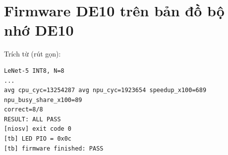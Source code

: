 \section{Firmware DE10 trên bản đồ bộ nhớ DE10}
Trích từ  (rút gọn):
\begin{lstlisting}[style=codelog]
LeNet-5 INT8, N=8
...
avg cpu_cyc=13254287 avg npu_cyc=1923654 speedup_x100=689 npu_busy_share_x100=89
correct=8/8
RESULT: ALL PASS
[niosv] exit code 0
[tb] LED PIO = 0x0c
[tb] firmware finished: PASS
\end{lstlisting}
